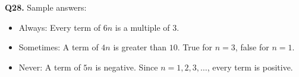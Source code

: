\documentclass[11pt,a4paper]{article}
\begin{document}
\textbf{Q28.} Sample answers:
\begin{itemize}
\item Always: Every term of \(6n\) is a multiple of \(3\).
\item Sometimes: A term of \(4n\) is greater than \(10\). True for \(n=3\), false for \(n=1\).
\item Never: A term of \(5n\) is negative. Since \(n=1,2,3,\ldots\), every term is positive.
\end{itemize}
\end{document}
